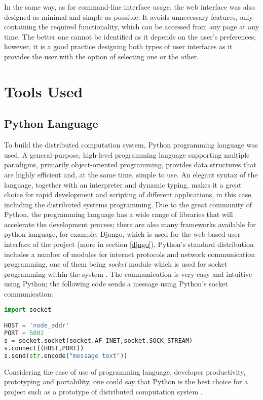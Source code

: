 \documentclass[10pt]{report}
\begin{document}
In the same way, as for command-line interface usage, the web interface was also designed as minimal and simple as possible. It avoids unnecessary features, only containing the required functionality, which can be accessed from any page at any time. The better one cannot be identified as it depends on the user's preferences; however, it is a good practice designing both types of user interfaces as it provides the user with the option of selecting one or the other.

\section{Tools Used}

\subsection{Python Language}

To build the distributed computation system, Python programming language was used. A general-purpose, high-level programming language supporting multiple paradigms, primarily object-oriented programming, provides data structures that are highly efficient and, at the same time, simple to use. An elegant syntax of the language, together with an interpreter and dynamic typing, makes it a great choice for rapid development and scripting of different applications, in this case, including the distributed systems programming. Due to the great community of Python, the programming language has a wide range of libraries that will accelerate the development process; there are also many frameworks available for python language, for example, Django, which is used for the web-based user interface of the project (more in section \ref{djngo}). Python's standard distribution includes a number of modules for internet protocols and network communication programming, one of them being \textit{socket} module which is used for socket programming within the system \cite{socket, sockethowto}. The communication is very easy and intuitive using Python; the following code sends a message using Python's socket communication:

\begin{lstlisting}[language=Python]
import socket

HOST = 'node_addr'
PORT = 5002
s = socket.socket(socket.AF_INET,socket.SOCK_STREAM)
s.connect((HOST,PORT))
s.send(str.encode("message text"))
\end{lstlisting}

Considering the ease of use of programming language, developer productivity, prototyping and portability, one could say that Python is the best choice for a project such as a prototype of distributed computation system \cite{pyeff}.
\end{document}
